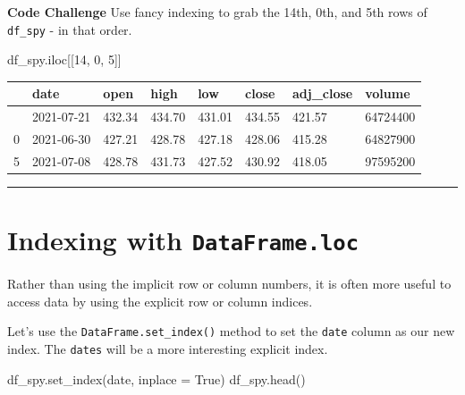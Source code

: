 \documentclass[
  letterpaper,
  DIV=11,
  numbers=noendperiod]{scrreprt}
\newenvironment{Shaded}{\begin{snugshade}}{\end{snugshade}}
\newcommand{\DecValTok}[1]{\textcolor[rgb]{0.68,0.00,0.00}{#1}}
\newcommand{\NormalTok}[1]{\textcolor[rgb]{0.00,0.23,0.31}{#1}}
\newcommand{\OperatorTok}[1]{\textcolor[rgb]{0.37,0.37,0.37}{#1}}
\newcommand{\StringTok}[1]{\textcolor[rgb]{0.13,0.47,0.30}{#1}}
\newcommand{\VariableTok}[1]{\textcolor[rgb]{0.07,0.07,0.07}{#1}}
\begin{document}
\textbf{Code Challenge} Use fancy indexing to grab the 14th, 0th, and
5th rows of \texttt{df\_spy} - in that order.

\begin{Shaded}
\begin{Highlighting}[]
\NormalTok{df\_spy.iloc[[}\DecValTok{14}\NormalTok{, }\DecValTok{0}\NormalTok{, }\DecValTok{5}\NormalTok{]]}
\end{Highlighting}
\end{Shaded}

\begin{longtable}[]{@{}llllllll@{}}
\toprule\noalign{}
& date & open & high & low & close & adj\_close & volume \\
\midrule\noalign{}
\endhead
\bottomrule\noalign{}
\endlastfoot
14 & 2021-07-21 & 432.34 & 434.70 & 431.01 & 434.55 & 421.57 &
64724400 \\
0 & 2021-06-30 & 427.21 & 428.78 & 427.18 & 428.06 & 415.28 &
64827900 \\
5 & 2021-07-08 & 428.78 & 431.73 & 427.52 & 430.92 & 418.05 &
97595200 \\
\end{longtable}

\begin{center}\rule{0.5\linewidth}{0.5pt}\end{center}

\hypertarget{indexing-with-dataframe.loc}{%
\section{\texorpdfstring{Indexing with
\texttt{DataFrame.loc}}{Indexing with DataFrame.loc}}\label{indexing-with-dataframe.loc}}

Rather than using the implicit row or column numbers, it is often more
useful to access data by using the explicit row or column indices.

Let's use the \texttt{DataFrame.set\_index()} method to set the
\texttt{date} column as our new index. The \texttt{dates} will be a more
interesting explicit index.

\begin{Shaded}
\begin{Highlighting}[]
\NormalTok{df\_spy.set\_index(}\StringTok{\textquotesingle{}date\textquotesingle{}}\NormalTok{, inplace }\OperatorTok{=} \VariableTok{True}\NormalTok{)}
\NormalTok{df\_spy.head()}
\end{Highlighting}
\end{Shaded}
\end{document}
